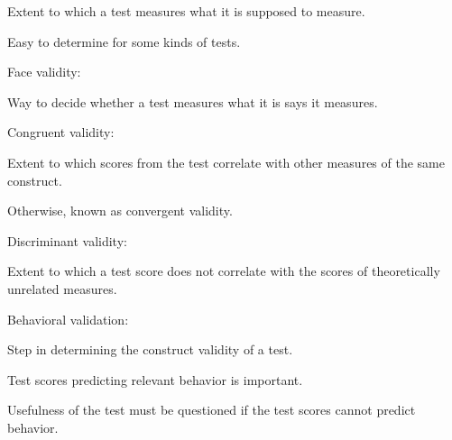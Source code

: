 \begin{coloredlist}
    \item Extent to which a test measures what it is supposed to measure.
    \item Easy to determine for some kinds of tests.
    \item Face validity:
    \begin{coloredlist}
        \item Way to decide whether a test measures what it is says it measures.
    \end{coloredlist}
    \item Congruent validity:
    \begin{coloredlist}
        \item Extent to which scores from the test correlate with other measures of the same construct.
        \item Otherwise, known as convergent validity.
    \end{coloredlist}
    \item Discriminant validity:
    \begin{coloredlist}
        \item Extent to which a test score does not correlate with the scores of theoretically unrelated measures.
    \end{coloredlist}
    \item Behavioral validation:
    \begin{coloredlist}
        \item Step in determining the construct validity of a test.
        \item Test scores predicting relevant behavior is important.
        \item Usefulness of the test must be questioned if the test scores cannot predict behavior.
    \end{coloredlist}
\end{coloredlist}